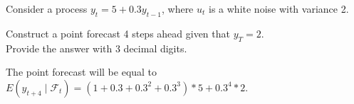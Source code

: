 
\begin{question}
Consider a process \(y_t = 5 + 0.3 y_{t-1}\), where \(u_t\) is a white noise with variance 2.

Construct a point forecast 4 steps ahead given that \(y_T=2\).\\
Provide the answer with 3 decimal digits.
\end{question}

\begin{solution}
The point forecast will be equal to \(E(y_{t+4}\mid \mathcal{F}_t) = (1 + 0.3 + 0.3^2 + 0.3^3)*5+0.3^4*2\).
\end{solution}

